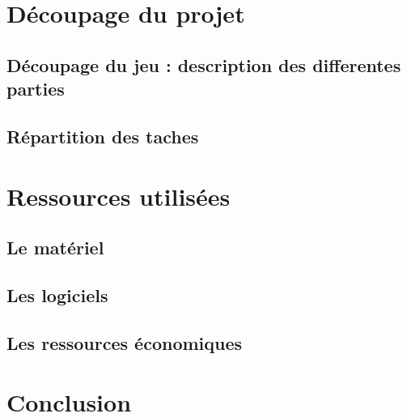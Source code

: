 \documentclass[12pt,a4paper]{article}
\begin{document}
\newpage
\section{Découpage du projet}
\subsection{Découpage du jeu : description des differentes parties}
\subsection{Répartition des taches}

\newpage
\section{Ressources utilisées}
\subsection{Le matériel}
\subsection{Les logiciels}
\subsection{Les ressources économiques}

\newpage
\section{Conclusion}	
\end{document}
